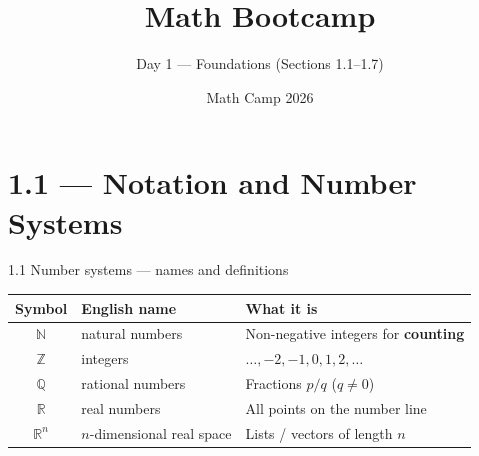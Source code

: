\documentclass[11pt,aspectratio=169]{beamer}
\title{Math Bootcamp}
\subtitle{Day 1 --- Foundations (Sections 1.1--1.7)}
\author{Math Camp 2026}
\date{}
\begin{document}
\begin{frame}
  \titlepage
\end{frame}

\section{1.1 --- Notation and Number Systems}

\begin{frame}{1.1 Number systems --- names and definitions}
  \small
  \begin{tabular}{@{}clp{}@{}}
    \toprule
    \textbf{Symbol} & \textbf{English name} & \textbf{What it is} \\
    \midrule
    $\mathbb{N}$ & natural numbers & Non-negative integers for \textbf{counting} \\
    $\mathbb{Z}$ & integers & $\ldots,-2,-1,0,1,2,\ldots$ \\
    $\mathbb{Q}$ & rational numbers & Fractions $p/q$ ($q\ne0$) \\
    $\mathbb{R}$ & real numbers & All points on the number line \\
    $\mathbb{R}^n$ & $n$-dimensional real space & Lists / vectors of length $n$ \\
    \bottomrule
  \end{tabular}

  \medskip
  \begin{center}
  \end{center}
\end{frame}
\end{document}
